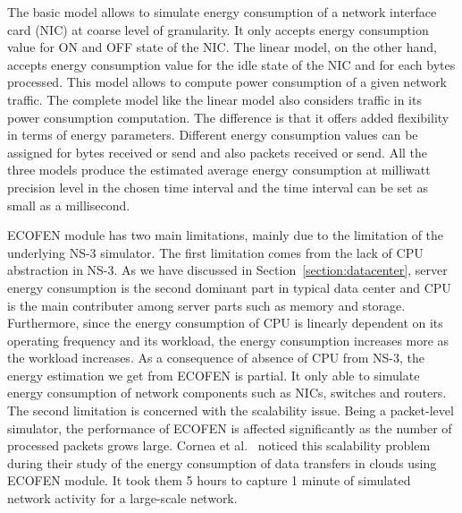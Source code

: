 The basic model allows to simulate energy consumption of a network interface card (NIC) at coarse level of granularity. It only accepts energy consumption value for ON and OFF state of the NIC. The linear model, on the other hand, accepts energy consumption value for the idle state of the NIC and for each bytes processed. This model allows to compute power consumption of a given network traffic. The complete model like the linear model also considers traffic in its power consumption computation. The difference is that it offers added flexibility in terms of energy parameters. Different energy consumption values can be assigned for bytes received or send and also packets received or send. All the three models produce the estimated average energy consumption at milliwatt precision level in the chosen time interval and the time interval can be set as small as a millisecond. 

ECOFEN module has two main limitations, mainly due to the limitation of the underlying NS-3 simulator. The first limitation comes from the lack of CPU abstraction in NS-3. As we have discussed in Section~\ref{section:datacenter}, server energy consumption is the second dominant part in typical data center and CPU is the main contributer among server parts such as memory and storage. Furthermore, since the energy consumption of CPU is linearly dependent on its operating frequency and its workload, the energy consumption increases more as the workload increases. As a consequence of absence of CPU from NS-3, the energy estimation we get from ECOFEN is partial. It only able to simulate energy consumption of network components such as NICs, switches and routers. The second limitation is concerned with the scalability issue. Being a packet-level simulator, the performance of ECOFEN is affected significantly as the number of processed packets grows large. Cornea et al.~\cite{DBLP:conf/cloudnet/CorneaOL14} noticed this scalability problem during their study of the energy consumption of data transfers in clouds using ECOFEN module. It took them 5 hours to capture 1 minute of simulated network activity for a large-scale network. 

